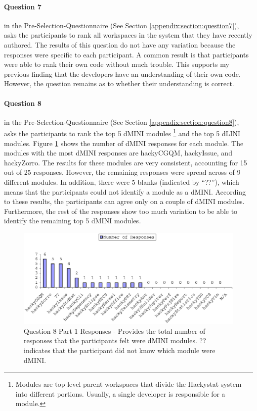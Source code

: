 \paragraph{Question 7} in the Pre-Selection-Questionnaire (See Section
\ref{appendix:section:question7}), asks the participants to rank all
workspaces in the system that they have recently authored. The results of
this question do not have any variation because the responses were specific
to each participant. A common result is that participants were able to rank
their own code without much trouble. This supports my previous finding that
the developers have an understanding of their own code. However, the
question remains as to whether their understanding is correct.

\paragraph{Question 8} in the Pre-Selection-Questionnaire (See Section
\ref{appendix:section:question8}), asks the participants to rank the top 5
dMINI modules \footnote{Modules are top-level parent workspaces that divide
  the Hackystat system into different portions. Usually, a single developer
  is responsible for a module.} and the top 5 dLINI modules. Figure
\ref{fig:pre-selection-questionnaire-results-8-2} shows the number of dMINI
responses for each module. The modules with the most dMINI responses are
hackyCGQM, hackyIssue, and hackyZorro. The results for these modules are
very consistent, accounting for 15 out of 25 responses. However, the
remaining responses were spread across of 9 different modules. In addition,
there were 5 blanks (indicated by ``??''), which means that the
participants could not identify a module as a dMINI. According to these
results, the participants can agree only on a couple of dMINI modules.
Furthermore, the rest of the responses show too much variation to be able
to identify the remaining top 5 dMINI modules.

\begin{figure}[!h]
  \centering
  \includegraphics[width=1.0\textwidth]{figs/Results/pre-selection-questionnaire-8-sort.eps}
  \caption[Question 8 Part 1 Responses]{Question 8 Part 1 Responses -
    Provides the total number of responses that the participants felt were
    dMINI modules. ?? indicates that the participant did not know which
    module were dMINI.}
  \label{fig:pre-selection-questionnaire-results-8-2}
\end{figure}

